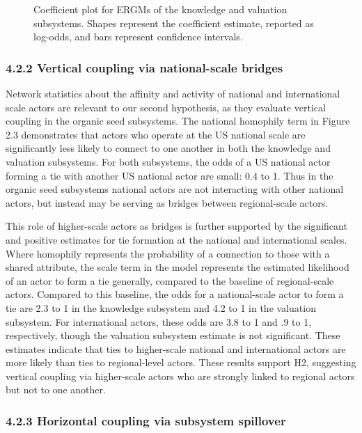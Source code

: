 \documentclass[twoside,12pt,final]{ucthesis-CA2012}
\begin{document}
\begin{ucmainmatter}
\begin{figure}
\caption{Coefficient plot for ERGMs of the knowledge and valuation subsystems. Shapes represent the coefficient estimate, reported as log-odds, and bars represent confidence intervals.}\label{fig:unnamed-chunk-20}
\end{figure}
\hypertarget{vertical-coupling-via-national-scale-bridges}{%
\subsubsection{4.2.2 Vertical coupling via national-scale bridges}\label{vertical-coupling-via-national-scale-bridges}}

Network statistics about the affinity and activity of national and
international scale actors are relevant to our second hypothesis, as
they evaluate vertical coupling in the organic seed subsystems. The
national homophily term in Figure 2.3 demonstrates that actors who
operate at the US national scale are significantly less likely to
connect to one another in both the knowledge and valuation subsystems.
For both subsystems, the odds of a US national actor forming a tie with
another US national actor are small: 0.4 to 1. Thus in the organic seed
subsystems national actors are not interacting with other national
actors, but instead may be serving as bridges between regional-scale
actors.

This role of higher-scale actors as bridges is further supported by the
significant and positive estimates for tie formation at the national and
international scales. Where homophily represents the probability of a
connection to those with a shared attribute, the \textquotesingle scale\textquotesingle{} term in the
model represents the estimated likelihood of an actor to form a tie
generally, compared to the baseline of regional-scale actors. Compared
to this baseline, the odds for a national-scale actor to form a tie are
2.3 to 1 in the knowledge subsystem and 4.2 to 1 in the valuation
subsystem. For international actors, these odds are 3.8 to 1 and .9 to
1, respectively, though the valuation subsystem estimate is not
significant. These estimates indicate that ties to higher-scale national
and international actors are more likely than ties to regional-level
actors. These results support H2, suggesting vertical coupling via
higher-scale actors who are strongly linked to regional actors but not
to one another.

\hypertarget{horizontal-coupling-via-subsystem-spillover}{%
\subsubsection{4.2.3 Horizontal coupling via subsystem spillover}\label{horizontal-coupling-via-subsystem-spillover}}


\end{ucmainmatter}
\end{document}
